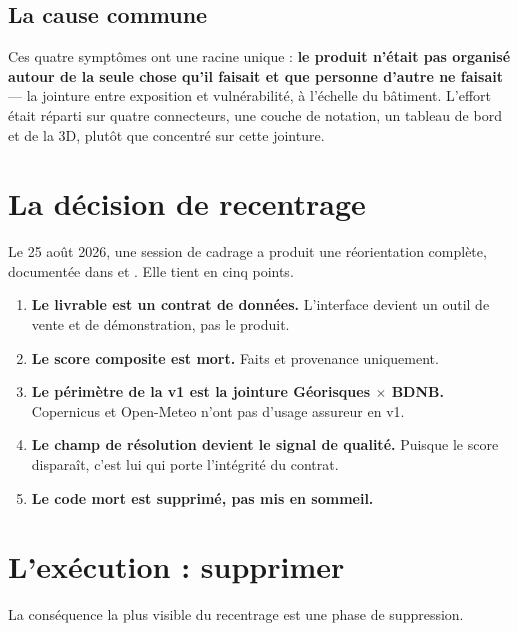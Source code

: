 \subsection{La cause commune}

Ces quatre symptômes ont une racine unique : \textbf{le produit n'était pas
organisé autour de la seule chose qu'il faisait et que personne d'autre ne
faisait} — la jointure entre exposition et vulnérabilité, à l'échelle du
bâtiment. L'effort était réparti sur quatre connecteurs, une couche de
notation, un tableau de bord et de la 3D, plutôt que concentré sur cette
jointure.

\section{La décision de recentrage}

Le 25 août 2026, une session de cadrage a produit une réorientation complète,
documentée dans  et
. Elle tient en cinq points.

\begin{enumerate}[leftmargin=1.6em]
  \item \textbf{Le livrable est un contrat de données.} L'interface devient un
        outil de vente et de démonstration, pas le produit.
  \item \textbf{Le score composite est mort.} Faits et provenance uniquement.
  \item \textbf{Le périmètre de la v1 est la jointure Géorisques $\times$
        BDNB.} Copernicus et Open-Meteo n'ont pas d'usage assureur en v1.
  \item \textbf{Le champ de résolution devient le signal de qualité.} Puisque
        le score disparaît, c'est lui qui porte l'intégrité du contrat.
  \item \textbf{Le code mort est supprimé, pas mis en sommeil.}
\end{enumerate}

\section{L'exécution : supprimer}

La conséquence la plus visible du recentrage est une phase de suppression.

